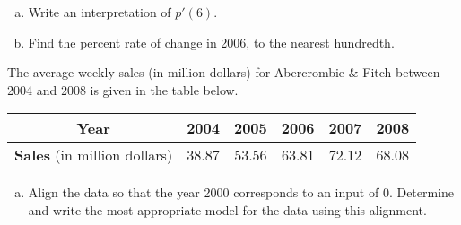 \documentclass[notes]{subfiles}
\begin{document}
\begin{ex}
\begin{enumerate}[(a)]
				\item Write an interpretation of $p'(6)$.

				\item Find the percent rate of change in 2006, to the nearest hundredth.
			\end{enumerate}
		\end{ex}
		
		\begin{ex} The average weekly sales (in million dollars) for Abercrombie \& Fitch between 2004 and 2008 is given in the table below.
			\begin{center}
				{\renewcommand{\arraystretch}{1.2}
				\begin{tabular}{|c|c|c|c|c|c|}\hline
					\textbf{Year} & 2004 & 2005 & 2006 & 2007 & 2008 \\ \hline
					\textbf{Sales} (in million dollars) & 38.87 & 53.56 & 63.81 & 72.12 & 68.08\\ \hline
				\end{tabular}
				}
			\end{center}
			\begin{enumerate}[(a)]
				\item Align the data so that the year 2000 corresponds to an input of 0.  Determine and write the most appropriate model for the data using this alignment.
					\newpage


\end{enumerate}
\end{ex}
\end{document}
